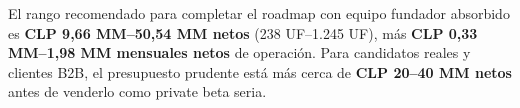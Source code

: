 \documentclass[11pt,a4paper]{article}
\begin{document}
El rango recomendado para completar el roadmap con equipo fundador absorbido es \textbf{CLP 9,66 MM--50,54 MM netos} (238 UF--1.245 UF), más \textbf{CLP 0,33 MM--1,98 MM mensuales netos} de operación. Para candidatos reales y clientes B2B, el presupuesto prudente está más cerca de \textbf{CLP 20--40 MM netos} antes de venderlo como private beta seria.
\end{document}
